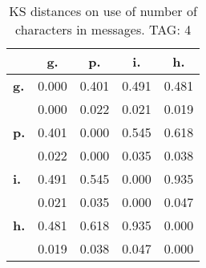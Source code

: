 \begin{table}[h!]
\begin{center}
\begin{tabular}{| l || c | c | c | c |}\hline
 & {\bf g.} & {\bf p.} & {\bf i.} & {\bf h.} \\\hline\hline
{\bf g.} & 0.000 & 0.401 & 0.491 & 0.481 \\
{\bf } & 0.000 & 0.022 & 0.021 & 0.019 \\\hline
{\bf p.} & 0.401 & 0.000 & 0.545 & 0.618 \\
{\bf } & 0.022 & 0.000 & 0.035 & 0.038 \\\hline
{\bf i.} & 0.491 & 0.545 & 0.000 & 0.935 \\
{\bf } & 0.021 & 0.035 & 0.000 & 0.047 \\\hline
{\bf h.} & 0.481 & 0.618 & 0.935 & 0.000 \\
{\bf } & 0.019 & 0.038 & 0.047 & 0.000 \\\hline
\end{tabular}
\caption{KS distances on use of number of characters in messages. TAG: 4}
\end{center}
\end{table}